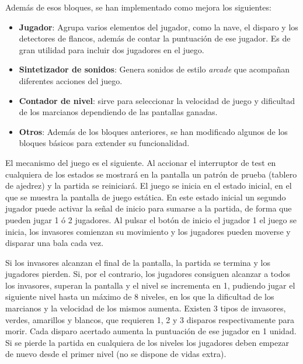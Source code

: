 Además de esos bloques, se han implementado como mejora los siguientes:
\begin{itemize}
	\item {\bfseries Jugador}: Agrupa varios elementos del jugador, como la nave, el disparo y los detectores de flancos, además de contar la puntuación de ese jugador. Es de gran utilidad para incluir dos jugadores en el juego.
	\item {\bfseries Sintetizador de sonidos}: Genera sonidos de estilo \textit{arcade} que acompañan diferentes acciones del juego.
	\item {\bfseries Contador de nivel}: sirve para seleccionar la velocidad de juego y dificultad de los marcianos dependiendo de las pantallas ganadas.
	\item {\bfseries Otros}: Además de los bloques anteriores, se han modificado algunos de los bloques básicos para extender su funcionalidad.
\end{itemize}

El mecanismo del juego es el siguiente. Al accionar el interruptor de test en cualquiera de los estados se mostrará en la pantalla un patrón de prueba (tablero de ajedrez) y la partida se reiniciará. El juego se inicia en el estado inicial, en el que se muestra la pantalla de juego estática. En este estado inicial un segundo jugador puede activar la señal de inicio para sumarse a la partida, de forma que pueden jugar 1 ó 2 jugadores. Al pulsar el botón de inicio el jugador 1 el juego se inicia, los invasores comienzan su movimiento y los jugadores pueden moverse y disparar una bala cada vez. 

Si los invasores alcanzan el final de la pantalla, la partida se termina y los jugadores pierden. Si, por el contrario, los jugadores consiguen alcanzar a todos los invasores, superan la pantalla y el nivel se incrementa en 1, pudiendo jugar el siguiente nivel hasta un máximo de 8 niveles, en los que la dificultad de los marcianos y la velocidad de los mismos aumenta. Existen 3 tipos de invasores, verdes, amarillos y blancos, que requieren 1, 2 y 3 disparos respectivamente para morir. Cada disparo acertado aumenta la puntuación de ese jugador en 1 unidad. Si se pierde la partida en cualquiera de los niveles los jugadores deben empezar de nuevo desde el primer nivel (no se dispone de vidas extra).

\newpage
